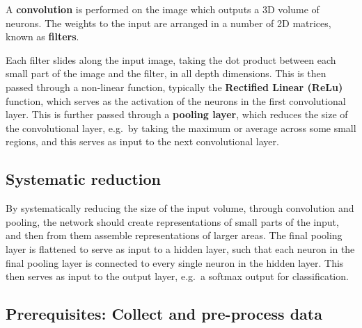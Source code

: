 \documentclass[%
oneside,                 %
final,                   %
10pt]{article}
\begin{document}
A \textbf{convolution} is performed on the image which outputs
a 3D volume of neurons. The weights to the input are arranged in a number of 2D matrices, known as \textbf{filters}.

Each filter slides along the input image, taking the dot product
between each small part of the image and the filter, in all depth
dimensions. This is then passed through a non-linear function,
typically the \textbf{Rectified Linear (ReLu)} function, which serves as the
activation of the neurons in the first convolutional layer. This is
further passed through a \textbf{pooling layer}, which reduces the size of the
convolutional layer, e.g.~by taking the maximum or average across some
small regions, and this serves as input to the next convolutional
layer.

\subsection{Systematic reduction}

By systematically reducing the size of the input volume, through
convolution and pooling, the network should create representations of
small parts of the input, and then from them assemble representations
of larger areas.  The final pooling layer is flattened to serve as
input to a hidden layer, such that each neuron in the final pooling
layer is connected to every single neuron in the hidden layer. This
then serves as input to the output layer, e.g.~a softmax output for
classification.


\subsection{Prerequisites: Collect and pre-process data}
\end{document}
